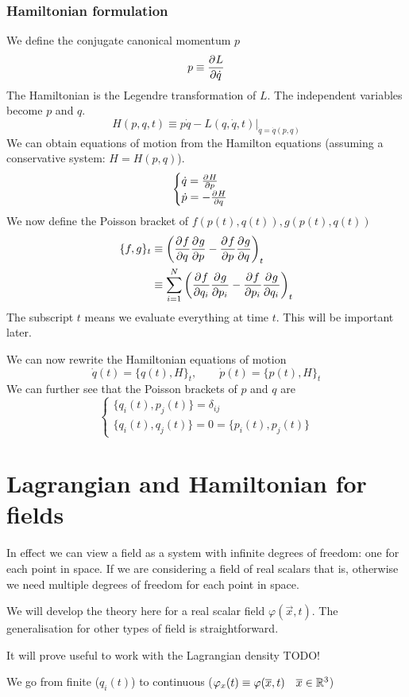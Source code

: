 \subsubsection{Hamiltonian formulation}
We define the conjugate canonical momentum $p$
\[ p \equiv  \frac{\partial{^{}}L}{\partial{{\dot{q}}^{}}}  \]
The Hamiltonian is the Legendre transformation of $L$. The independent variables become $p$ and $q$.
\[ H(p, q, t) \equiv \left.p\dot{q} - L(q, \dot{q}, t)\right|_{\dot{q} = \dot{q}(p,q)} \]
We can obtain equations of motion from the Hamilton equations (assuming a conservative system: $H = H(p,q)$).
\[ \begin{cases}
\dot{q} =  \frac{\partial{^{}}H}{\partial{{p}^{}}}  \\ \dot{p} = -  \frac{\partial{^{}}H}{\partial{{q}^{}}} 
\end{cases} \]
We now define the Poisson bracket of $f(p(t),q(t)), g(p(t),q(t))$
\begin{align*}
\{ f,g \}_t &\equiv \left( \frac{\partial{^{}}f}{\partial{{q}^{}}}  \frac{\partial{^{}}g}{\partial{{p}^{}}} -  \frac{\partial{^{}}f}{\partial{{p}^{}}}  \frac{\partial{^{}}g}{\partial{{q}^{}}} \right)_t \\
&\equiv \sum^N_{i=1}\left( \frac{\partial{^{}}f}{\partial{{q_i}^{}}}  \frac{\partial{^{}}g}{\partial{{p_i}^{}}} -  \frac{\partial{^{}}f}{\partial{{p_i}^{}}}  \frac{\partial{^{}}g}{\partial{{q_i}^{}}} \right)_t
\end{align*}
The subscript $t$ means we evaluate everything at time $t$. This will be important later.

We can now rewrite the Hamiltonian equations of motion
\[ \dot{q}(t) = \{q(t), H\}_t, \qquad \dot{p}(t) = \{p(t),H\}_t \]
We can further see that the Poisson brackets of $p$ and $q$ are
\[\begin{cases}
\{ q_i(t), p_j(t) \} = \delta_{ij} \\
\{ q_i(t), q_j(t) \} = 0 = \{ p_i(t), p_j(t) \}
\end{cases}\]

\section{Lagrangian and Hamiltonian for fields}
In effect we can view a field as a system with infinite degrees of freedom: one for each point in space. If we are considering a field of real scalars that is, otherwise we need multiple degrees of freedom for each point in space.

We will develop the theory here for a real scalar field $\varphi(\vec{x},t)$. The generalisation for other types of field is straightforward.

It will prove useful to work with the Lagrangian density TODO!


We go from finite ($q_i(t)$) to continuous ($\varphi_x(t) \equiv \varphi(\overline{x},t) \quad \overline{x}\in\mathbb{R}^3$)

